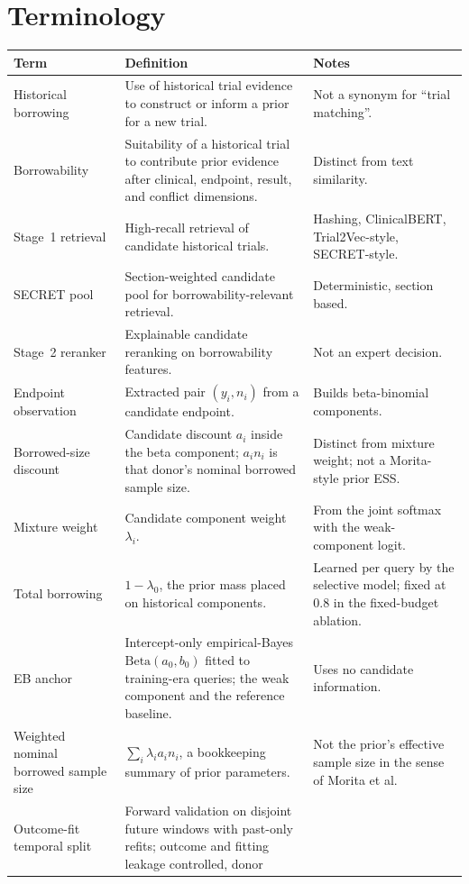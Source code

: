 \documentclass[11pt]{article}
\newcommand{\lamz}{\lambda_{0}}
\begin{document}
\section{Terminology}
\begin{longtable}{p{} p{} p{}}
\toprule
\textbf{Term} & \textbf{Definition} & \textbf{Notes} \\
\midrule
\endhead
Historical borrowing & Use of historical trial evidence to construct or inform
a prior for a new trial. & Not a synonym for ``trial matching''. \\
Borrowability & Suitability of a historical trial to contribute prior evidence
after clinical, endpoint, result, and conflict dimensions. & Distinct from text
similarity. \\
Stage~1 retrieval & High-recall retrieval of candidate historical trials. &
Hashing, ClinicalBERT, Trial2Vec-style, SECRET-style. \\
SECRET pool & Section-weighted candidate pool for borrowability-relevant
retrieval. & Deterministic, section based. \\
Stage~2 reranker & Explainable candidate reranking on borrowability features. &
Not an expert decision. \\
Endpoint observation & Extracted pair $(y_i,n_i)$ from a candidate endpoint. &
Builds beta-binomial components. \\
Borrowed-size discount & Candidate discount $a_i$ inside the beta
component; $a_i n_i$ is that donor's nominal borrowed sample size. & Distinct
from mixture weight; not a Morita-style prior ESS. \\
Mixture weight & Candidate component weight $\lambda_i$. & From the joint
softmax with the weak-component logit. \\
Total borrowing & $1-\lamz$, the prior mass placed on historical components.
& Learned per query by the selective model; fixed at $0.8$ in the
fixed-budget ablation. \\
EB anchor & Intercept-only empirical-Bayes $\mathrm{Beta}(a_0,b_0)$ fitted to
training-era queries; the weak component and the reference baseline. & Uses no
candidate information. \\
Weighted nominal borrowed sample size & $\sum_i \lambda_i a_i n_i$, a
bookkeeping summary of prior parameters. & Not the prior's effective sample
size in the sense of Morita et al. \\
Outcome-fit temporal split & Forward validation on disjoint future windows
with past-only refits; outcome and fitting leakage controlled, donor

\end{longtable}
\end{document}
